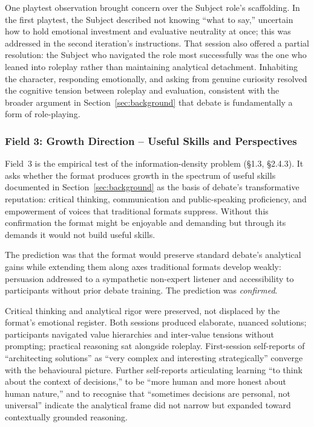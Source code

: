 One playtest observation brought concern over the Subject role's scaffolding. In the first playtest, the Subject described not knowing ``what to say,'' uncertain how to hold emotional investment and evaluative neutrality at once; this was addressed in the second iteration's instructions. That session also offered a partial resolution: the Subject who navigated the role most successfully was the one who leaned into roleplay rather than maintaining analytical detachment. Inhabiting the character, responding emotionally, and asking from genuine curiosity resolved the cognitive tension between roleplay and evaluation, consistent with the broader argument in Section~\ref{sec:background} that debate is fundamentally a form of role-playing.

\subsubsection{Field 3: Growth Direction -- Useful Skills and Perspectives}

Field~3 is the empirical test of the information-density problem (§1.3, §2.4.3). It asks whether the format produces growth in the spectrum of useful skills documented in Section~\ref{sec:background} as the basis of debate's transformative reputation: critical thinking, communication and public-speaking proficiency, and empowerment of voices that traditional formats suppress. Without this confirmation the format might be enjoyable and demanding but through its demands it would not build useful skills.

The prediction was that the format would preserve standard debate's analytical gains while extending them along axes traditional formats develop weakly: persuasion addressed to a sympathetic non-expert listener and accessibility to participants without prior debate training. The prediction was \textit{confirmed}.

Critical thinking and analytical rigor were preserved, not displaced by the format's emotional register. Both sessions produced elaborate, nuanced solutions; participants navigated value hierarchies and inter-value tensions without prompting; practical reasoning sat alongside roleplay. First-session self-reports of ``architecting solutions'' as ``very complex and interesting strategically'' converge with the behavioural picture. Further self-reports articulating learning ``to think about the context of decisions,'' to be ``more human and more honest about human nature,'' and to recognise that ``sometimes decisions are personal, not universal'' indicate the analytical frame did not narrow but expanded toward contextually grounded reasoning.

